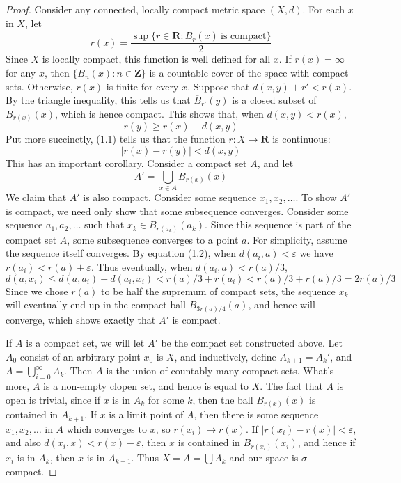 \documentclass[12pt]{report}
\theoremstyle{plain}
\theoremstyle{definition}
\begin{document}
\begin{proof}
    Consider any connected, locally compact metric space $(X,d)$. For each $x$ in $X$, let
    \[ r(x) = \frac{\sup \{ r \in \mathbf{R} : \overline{B}_r(x)\ \text{is compact} \}}{2} \]
    Since $X$ is locally compact, this function is well defined for all $x$. If $r(x) = \infty$ for any $x$, then $\{ \overline{B}_n(x) : n \in \mathbf{Z} \}$ is a countable cover of the space with compact sets. Otherwise, $r(x)$ is finite for every $x$. Suppose that $d(x,y) + r' < r(x)$. By the triangle inequality, this tells us that $\overline{B}_{r'}(y)$ is a closed subset of $\overline{B}_{r(x)}(x)$, which is hence compact. This shows that, when $d(x,y) < r(x)$,
    \begin{equation} r(y) \geq r(x) - d(x,y) \end{equation}
    Put more succinctly, (1.1) tells us that the function $r:X \to \mathbf{R}$ is continuous:
    \begin{equation} |r(x) - r(y)| < d(x,y) \end{equation}
    This has an important corollary. Consider a compact set $A$, and let
    \begin{equation} A' = \bigcup_{x \in A} \overline{B}_{r(x)}(x) \end{equation}
    We claim that $A'$ is also compact. Consider some sequence $x_1, x_2, \dots$. To show $A'$ is compact, we need only show that some subsequence converges. Consider some sequence $a_1, a_2, \dots$ such that $x_k \in B_{r(a_k)}(a_k)$. Since this sequence is part of the compact set $A$, some subsequence converges to a point $a$. For simplicity, assume the sequence itself converges. By equation (1.2), when $d(a_i, a) < \varepsilon$
    we have $r(a_i) < r(a) + \varepsilon$. Thus eventually, when $d(a_i,a) < r(a)/3$,
    \begin{equation} d(a,x_i) \leq d(a,a_i) + d(a_i,x_i) < r(a)/3 + r(a_i) < r(a)/3 + r(a)/3 = 2r(a)/3 \end{equation}
    Since we chose $r(a)$ to be half the supremum of compact sets, the sequence $x_k$ will eventually end up in the compact ball $B_{3r(a)/4}(a)$, and hence will converge, which shows exactly that $A'$ is compact.

    If $A$ is a compact set, we will let $A'$ be the compact set constructed above. Let $A_0$ consist of an arbitrary point $x_0$ is $X$, and inductively, define $A_{k+1} = A_k'$, and $A = \bigcup_{i = 0}^\infty A_k$. Then $A$ is the union of countably many compact sets. What's more, $A$ is a non-empty clopen set, and hence is equal to $X$. The fact that $A$ is open is trivial, since if $x$ is in $A_k$ for some $k$, then the ball $B_{r(x)}(x)$ is contained in $A_{k+1}$. If $x$ is a limit point of $A$, then there is some sequence $x_1, x_2, \dots$ in $A$ which converges to $x$, so $r(x_i) \to r(x)$. If $|r(x_i) - r(x)| < \varepsilon$, and also $d(x_i,x) < r(x) - \varepsilon$, then $x$ is contained in $B_{r(x_i)}(x_i)$, and hence if $x_i$ is in $A_k$, then $x$ is in $A_{k+1}$. Thus $X = A = \bigcup A_k$ and our space is $\sigma$-compact.
\end{proof}
\end{document}
